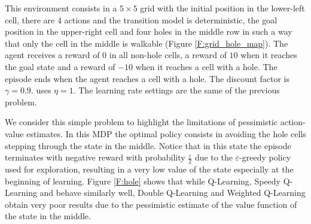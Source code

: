 \documentclass[conference]{IEEEtran}
\begin{document}
This environment consists in a $5 \times 5$ grid with the initial position in the lower-left cell, there are $4$ actions and the transition model is deterministic, the goal position in the upper-right cell and four holes in the middle row in such a way that only the cell in the middle is walkable (Figure \ref{F:grid_hole_map}). The agent receives a reward of $0$ in all non-hole cells, a reward of $10$ when it reaches the goal state and a reward of $-10$ when it reaches a cell with a hole. The episode ends when the agent reaches a cell with a hole. The discount factor is $\gamma = 0.9$. \alg uses $\eta = 1$.
The learning rate settings are the same of the previous problem.

We consider this simple problem to highlight the limitations of pessimistic action-value estimates. In this MDP the optimal policy consists in avoiding the hole cells stepping through the state in the middle. Notice that in this state the episode terminates with negative reward with probability $\frac{\varepsilon}{2}$ due to the $\varepsilon$-greedy policy used for exploration, resulting in a very low value of the state especially at the beginning of learning. Figure \ref{F:hole} shows that while Q-Learning, Speedy Q-Learning and \alg behave similarly well, Double Q-Learning and Weighted Q-Learning obtain very poor results due to the pessimistic estimate of the value function of the state in the middle.
\end{document}

